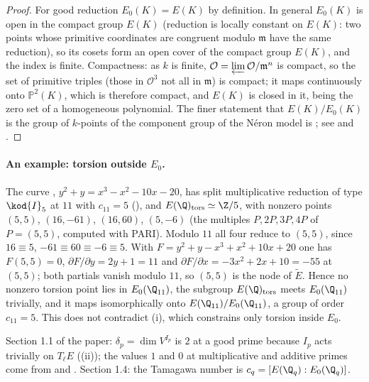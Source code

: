 \begin{proof}
For good reduction $E_0(K)=E(K)$ by definition. In general $E_0(K)$ is open in the compact group $E(K)$ (reduction is locally constant on $E(K)$: two points whose primitive
coordinates are congruent modulo $\mathfrak m$ have the same reduction), so its cosets form an open cover of the compact group $E(K)$, and the
index is finite. Compactness: as $k$ is finite, $\mathcal O=\varprojlim\mathcal O/\mathfrak m^n$ is compact, so the set of primitive triples
(those in $\mathcal O^3$ not all in $\mathfrak m$) is compact; it maps continuously onto $\mathbb P^2(K)$, which is therefore compact, and
$E(K)$ is closed in it, being the zero set of a homogeneous polynomial. The finer
statement that $E(K)/E_0(K)$ is the group of $k$-points of the component group of the N\'eron model is
; see \cite[VII.6]{SilvermanAEC} and \cite[IV.9]{SilvermanATAEC}.
\end{proof}

\paragraph{An example: torsion outside $E_0$.} The curve , $y^2+y=x^3-x^2-10x-20$, has split multiplicative
reduction of type $\kod{I}_5$ at $11$ with $c_{11}=5$ (), and $E(\Q)_{\mathrm{tors}}\simeq\Z/5$, with
nonzero points $(5,5)$, $(16,-61)$, $(16,60)$, $(5,-6)$ (the multiples $P,2P,3P,4P$ of $P=(5,5)$, computed with PARI). Modulo $11$
all four reduce to $(5,5)$, since $16\equiv5$, $-61\equiv60\equiv-6\equiv5$. With $F=y^2+y-x^3+x^2+10x+20$ one has $F(5,5)=0$,
$\partial F/\partial y=2y+1=11$ and $\partial F/\partial x=-3x^2+2x+10=-55$ at $(5,5)$; both partials vanish modulo $11$, so $(5,5)$ is
the node of $\tilde E$. Hence no nonzero torsion point lies in $E_0(\Q_{11})$, the subgroup $E(\Q)_{\mathrm{tors}}$ meets $E_0(\Q_{11})$
trivially, and it maps isomorphically onto $E(\Q_{11})/E_0(\Q_{11})$, a group of order $c_{11}=5$. This does not contradict
(i), which constrains only torsion inside $E_0$.

\begin{paperlink}
Section 1.1 of the paper: $\delta_p=\dim V^{I_p}$ is $2$ at a good prime because $I_p$ acts trivially on $T_\ell E$
((ii)); the values $1$ and $0$ at multiplicative and additive primes come
from  and . Section 1.4: the Tamagawa
number is $c_q=[E(\Q_q):E_0(\Q_q)]$.
\end{paperlink}

